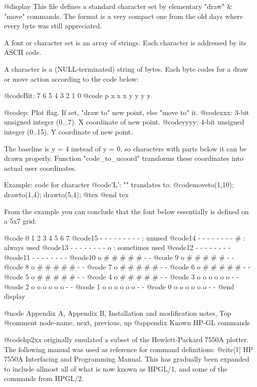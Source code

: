 @display
 This file defines a standard character set by elementary
 "draw" & "move" commands. The format is a very compact one from
 the old days where every byte was still appreciated.

 A font or character set is an array of strings. Each character is
 addressed by its ASCII code.

 A character is a (NULL-terminated) string of bytes. Each byte
 codes for a draw or move action according to the code below:

     @code{Bit: 7 6 5 4 3 2 1 0}
     @code{     p x x x y y y y}

 @code{p:   } Plot flag. If set, "draw to" new point, else "move to" it.
 @code{xxx: } 3-bit unsigned integer  (0...7). X coordinate of new point.
 @code{yyyy:} 4-bit unsigned integer (0..15). Y coordinate of new point.

 The baseline is y = 4 instead of y = 0, so characters with parts
 below it can be drawn properly. Function "code_to_ucoord" transforms
 these coordinates into actual user coordinates.

 Example:  code for character @code{'L': ""} translates to:
           @code{moveto(1,10); drawto(1,4); drawto(5,4);}
@tex
\page
@end tex

 From the example you can conclude that the font below essentially is
 defined on a 5x7 grid:

     @code{    0 1 2 3 4 5 6 7}
     @code{15  - - - - - - - -     - : unused}
     @code{14  - - - - - - - -     # : always used}
     @code{13  - - - - - - - -     o : sometimes used}
     @code{12  - - - - - - - -}
     @code{11  - - - - - - - -}
     @code{10  o # # # # # - -}
     @code{ 9  o # # # # # - -}
     @code{ 8  o # # # # # - -}
     @code{ 7  o # # # # # - -}
     @code{ 6  o # # # # # - -}
     @code{ 5  o # # # # # - -}
     @code{ 4  o # # # # # - -}
     @code{ 3  o o o o o o - -}
     @code{ 2  o o o o o o - -}
     @code{ 1  o o o o o o - -}
     @code{ 0  o o o o o o - -}
@end display



@node Appendix A, Appendix B, Installation and modification notes, Top
@comment  node-name,  next,  previous,  up
@appendix   Known HP-GL commands

@code{hp2xx} originally emulated a subset of the Hewlett-Packard 7550A plotter.
The following manual was used as reference for command definitions:
@cite{[1] HP 7550A Interfacing and Programming Manual}. This has gradually
been expanded to include allmost all of what is now known as HPGL/1, and
some of the commands from HPGL/2.

